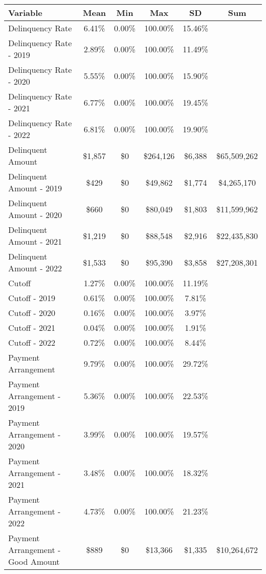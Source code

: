 \begin{tabular}{l|c|c|c|c|c}
\toprule 
\midrule 
Variable & Mean & Min & Max & SD & Sum \\
\midrule 
Delinquency Rate & 6.41\% & 0.00\% & 100.00\% & 15.46\% \\
\quad Delinquency Rate - 2019 & 2.89\% & 0.00\% & 100.00\% & 11.49\% \\
\quad Delinquency Rate - 2020 & 5.55\% & 0.00\% & 100.00\% & 15.90\% \\
\quad Delinquency Rate - 2021 & 6.77\% & 0.00\% & 100.00\% & 19.45\% \\
\quad Delinquency Rate - 2022 & 6.81\% & 0.00\% & 100.00\% & 19.90\% \\
\midrule 
Delinquent Amount & \$1,857 & \$0 & \$264,126 & \$6,388 & \$65,509,262 \\
\quad Delinquent Amount - 2019 & \$429 & \$0 & \$49,862 & \$1,774 & \$4,265,170 \\
\quad Delinquent Amount - 2020 & \$660 & \$0 & \$80,049 & \$1,803 & \$11,599,962 \\
\quad Delinquent Amount - 2021 & \$1,219 & \$0 & \$88,548 & \$2,916 & \$22,435,830 \\
\quad Delinquent Amount - 2022 & \$1,533 & \$0 & \$95,390 & \$3,858 & \$27,208,301 \\
\midrule 
Cutoff & 1.27\% & 0.00\% & 100.00\% & 11.19\% \\
\quad Cutoff - 2019 & 0.61\% & 0.00\% & 100.00\% & 7.81\% \\
\quad Cutoff - 2020 & 0.16\% & 0.00\% & 100.00\% & 3.97\% \\
\quad Cutoff - 2021 & 0.04\% & 0.00\% & 100.00\% & 1.91\% \\
\quad Cutoff - 2022 & 0.72\% & 0.00\% & 100.00\% & 8.44\% \\
\midrule 
Payment Arrangement & 9.79\% & 0.00\% & 100.00\% & 29.72\% \\
\quad Payment Arrangement - 2019 & 5.36\% & 0.00\% & 100.00\% & 22.53\% \\
\quad Payment Arrangement - 2020 & 3.99\% & 0.00\% & 100.00\% & 19.57\% \\
\quad Payment Arrangement - 2021 & 3.48\% & 0.00\% & 100.00\% & 18.32\% \\
\quad Payment Arrangement - 2022 & 4.73\% & 0.00\% & 100.00\% & 21.23\% \\
\quad Payment Arrangement - Good Amount & \$889 & \$0 & \$13,366 & \$1,335 & \$10,264,672 \\

\end{tabular}
